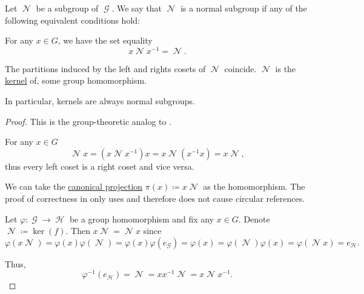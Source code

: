 \begin{definition}\label{def:normal_subgroup}
  Let \( \mscrN \) be a subgroup of \( \mscrG \). We say that \( \mscrN \) is a normal subgroup if any of the following equivalent conditions hold:
  \begin{thmenum}
     For any \( x \in G \), we have the set equality
    \begin{equation}\label{eq:def:normal_subgroup/direct}
      x \mscrN x^{-1} = \mscrN.
    \end{equation}

     The partitions induced by the left and rights cosets of \( \mscrN \) coincide.
     \( \mscrN \) is the \hyperref[def:unital_magma_kernel]{kernel} of, some group homomorphism.
  \end{thmenum}

  In particular, kernels are always normal subgroups.
\end{definition}
\begin{proof}
  This is the group-theoretic analog to .

   For any \( x \in G \)
  \begin{equation*}
    \mscrN x = (x \mscrN x^{-1})x = x \mscrN(x^{-1}x) = x \mscrN,
  \end{equation*}
  thus every left coset is a right coset and vice versa.

   We can take the \hyperref[def:quotient_group]{canonical projection} \( \pi(x) \coloneqq x \mscrN \) as the homomorphism. The proof of correctness in  only uses  and therefore does not cause circular references.

   Let \( \varphi: \mscrG \to \mscrH \) be a group homomorphism and fix any \( x \in G \). Denote \( \mscrN \coloneqq \ker(f) \). Then \( x \mscrN = \mscrN x \) since
  \begin{equation*}
    \varphi(x \mscrN)
    =
    \varphi(x) \varphi(\mscrN)
    =
    \varphi(x) \varphi(e_{\mscrG})
    =
    \varphi(x)
    =
    \varphi(\mscrN) \varphi(x)
    =
    \varphi(\mscrN x)
    =
    e_{\mscrH}.
  \end{equation*}

  Thus,
  \begin{equation*}
    \varphi^{-1}(e_{\mscrH}) = \mscrN = xx^{-1}\mscrN = x \mscrN x^{-1}.
  \end{equation*}
\end{proof}

